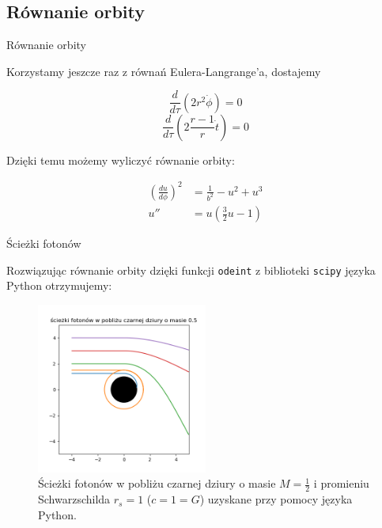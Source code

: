 \documentclass[polish, 9pt, xcolor=table, hyperref={pdfpagemode=FullScreen}]{beamer}
\begin{document}
\subsection{Równanie orbity}

\begin{frame}{Równanie orbity}

Korzystamy jeszcze raz z równań Eulera-Langrange'a, dostajemy

$$ \frac{d}{d\tau}(2r^2\dot{\phi})=0 $$
$$ \frac{d}{d\tau}\left(2\frac{r-1}{r}\dot{t}\right)=0 $$

Dzięki temu możemy wyliczyć równanie orbity:

\begin{align}
  \left(\frac{du}{d\phi}\right)^2&=\frac{1}{b^2}-u^2+u^3\label{rownanie_orbity}\\ 
  u'' &=u\left(\frac{3}{2}u-1\right)\label{zmiana predkosci}
\end{align}

\end{frame}

\begin{frame}{Ścieżki fotonów}

Rozwiązując równanie orbity dzięki funkcji  \texttt{odeint} z biblioteki \texttt{scipy} języka Python otrzymujemy:

\begin{figure}[h]
  \centering
  \includegraphics[width=0.5\textwidth]{ilustracje/sceizki_wykres.png}
  \caption{Ścieżki fotonów w pobliżu czarnej dziury o masie $M=\frac{1}{2}$ i promieniu Schwarzschilda $r_s=1$ ($c=1=G$) uzyskane przy pomocy języka Python.}
\end{figure}

\end{frame}
\end{document}
